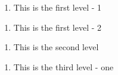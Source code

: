 \documentclass{book}
\begin{document}
\begin{enumerate}[1]
\item This is the first level - 1

\end{enumerate}
\begin{enumerate}[1, start=2]
\item This is the first level - 2

\end{enumerate}
\begin{enumerate}[a]
\item This is the second level

\end{enumerate}
\begin{enumerate}[i]
\item This is the third level - one

\end{enumerate}
\end{document}
